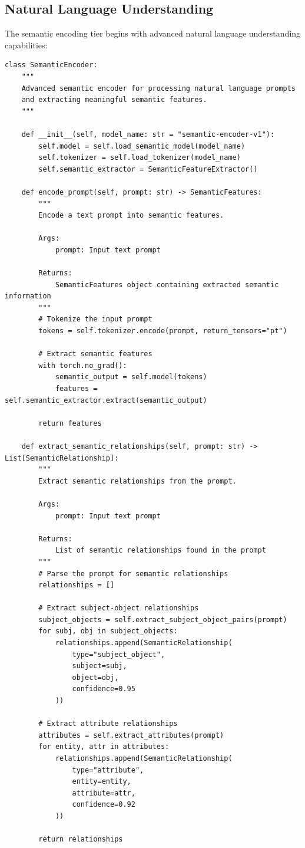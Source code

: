 \documentclass[11pt]{article}
\begin{document}
\subsection{Natural Language Understanding}

The semantic encoding tier begins with advanced natural language understanding capabilities:

\begin{lstlisting}[style=python]
class SemanticEncoder:
    """
    Advanced semantic encoder for processing natural language prompts
    and extracting meaningful semantic features.
    """
    
    def __init__(self, model_name: str = "semantic-encoder-v1"):
        self.model = self.load_semantic_model(model_name)
        self.tokenizer = self.load_tokenizer(model_name)
        self.semantic_extractor = SemanticFeatureExtractor()
    
    def encode_prompt(self, prompt: str) -> SemanticFeatures:
        """
        Encode a text prompt into semantic features.
        
        Args:
            prompt: Input text prompt
            
        Returns:
            SemanticFeatures object containing extracted semantic information
        """
        # Tokenize the input prompt
        tokens = self.tokenizer.encode(prompt, return_tensors="pt")
        
        # Extract semantic features
        with torch.no_grad():
            semantic_output = self.model(tokens)
            features = self.semantic_extractor.extract(semantic_output)
        
        return features
    
    def extract_semantic_relationships(self, prompt: str) -> List[SemanticRelationship]:
        """
        Extract semantic relationships from the prompt.
        
        Args:
            prompt: Input text prompt
            
        Returns:
            List of semantic relationships found in the prompt
        """
        # Parse the prompt for semantic relationships
        relationships = []
        
        # Extract subject-object relationships
        subject_objects = self.extract_subject_object_pairs(prompt)
        for subj, obj in subject_objects:
            relationships.append(SemanticRelationship(
                type="subject_object",
                subject=subj,
                object=obj,
                confidence=0.95
            ))
        
        # Extract attribute relationships
        attributes = self.extract_attributes(prompt)
        for entity, attr in attributes:
            relationships.append(SemanticRelationship(
                type="attribute",
                entity=entity,
                attribute=attr,
                confidence=0.92
            ))
        
        return relationships
\end{lstlisting}
\end{document}
